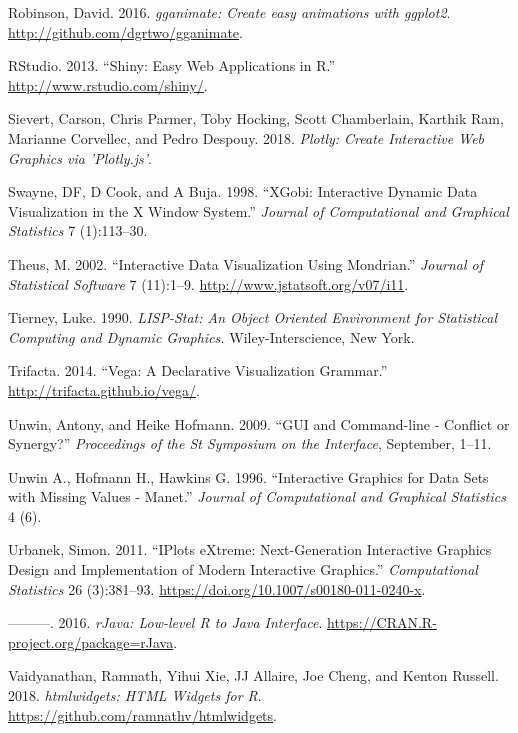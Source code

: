 \documentclass[12pt,]{article}
\theoremstyle{definition}
\theoremstyle{definition}
\theoremstyle{definition}
\theoremstyle{remark}
\begin{document}
\leavevmode\hypertarget{ref-gganimate}{}%
Robinson, David. 2016. \emph{gganimate: Create easy animations with
ggplot2}. \url{http://github.com/dgrtwo/gganimate}.

\leavevmode\hypertarget{ref-shiny}{}%
RStudio. 2013. ``Shiny: Easy Web Applications in R.''
\url{http://www.rstudio.com/shiny/}.

\leavevmode\hypertarget{ref-plotly}{}%
Sievert, Carson, Chris Parmer, Toby Hocking, Scott Chamberlain, Karthik
Ram, Marianne Corvellec, and Pedro Despouy. 2018. \emph{Plotly: Create
Interactive Web Graphics via 'Plotly.js'}.

\leavevmode\hypertarget{ref-xgobi}{}%
Swayne, DF, D Cook, and A Buja. 1998. ``XGobi: Interactive Dynamic Data
Visualization in the X Window System.'' \emph{Journal of Computational
and Graphical Statistics} 7 (1):113--30.

\leavevmode\hypertarget{ref-mondrian}{}%
Theus, M. 2002. ``Interactive Data Visualization Using Mondrian.''
\emph{Journal of Statistical Software} 7 (11):1--9.
\url{http://www.jstatsoft.org/v07/i11}.

\leavevmode\hypertarget{ref-LISP-STAT}{}%
Tierney, Luke. 1990. \emph{LISP-Stat: An Object Oriented Environment for
Statistical Computing and Dynamic Graphics.} Wiley-Interscience, New
York.

\leavevmode\hypertarget{ref-vega}{}%
Trifacta. 2014. ``Vega: A Declarative Visualization Grammar.''
\url{http://trifacta.github.io/vega/}.

\leavevmode\hypertarget{ref-Unwin:1999vp}{}%
Unwin, Antony, and Heike Hofmann. 2009. ``GUI and Command-line -
Conflict or Synergy?'' \emph{Proceedings of the St Symposium on the
Interface}, September, 1--11.

\leavevmode\hypertarget{ref-MANET}{}%
Unwin A., Hofmann H., Hawkins G. 1996. ``Interactive Graphics for Data
Sets with Missing Values - Manet.'' \emph{Journal of Computational and
Graphical Statistics} 4 (6).

\leavevmode\hypertarget{ref-Urbanek2011}{}%
Urbanek, Simon. 2011. ``IPlots eXtreme: Next-Generation Interactive
Graphics Design and Implementation of Modern Interactive Graphics.''
\emph{Computational Statistics} 26 (3):381--93.
\url{https://doi.org/10.1007/s00180-011-0240-x}.

\leavevmode\hypertarget{ref-rJava}{}%
---------. 2016. \emph{rJava: Low-level R to Java Interface}.
\url{https://CRAN.R-project.org/package=rJava}.

\leavevmode\hypertarget{ref-htmlwidgets}{}%
Vaidyanathan, Ramnath, Yihui Xie, JJ Allaire, Joe Cheng, and Kenton
Russell. 2018. \emph{htmlwidgets: HTML Widgets for R}.
\url{https://github.com/ramnathv/htmlwidgets}.
\end{document}
